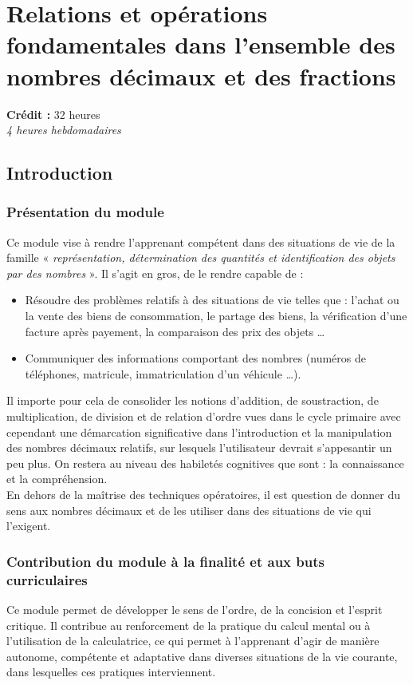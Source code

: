 \chapter{Relations et opérations fondamentales dans l'ensemble des nombres décimaux et des fractions}
 
{\AlegreyaSansLight \large
\begin{center}
\textbf{Crédit :} 32 heures\\
\textit{4 heures hebdomadaires}
\end{center}
}

\minitoc

\section{Introduction}
\subsection{Présentation du module}
Ce module vise à rendre l'apprenant compétent dans des situations de vie de la famille « \textit{représentation, détermination des quantités et identification des objets
par des nombres} ». Il s'agit en gros, de le rendre capable de :
\begin{itemize}
\item Résoudre des problèmes relatifs à des situations de vie telles que : l'achat ou la vente des biens de consommation, le partage des biens, la vérification
d'une facture après payement, la comparaison des prix des objets …
\item Communiquer des informations comportant des nombres (numéros de téléphones, matricule, immatriculation d'un véhicule …).
\end{itemize}
Il importe pour cela de consolider les notions d'addition, de soustraction, de multiplication, de division et de relation d'ordre vues dans le cycle primaire avec
cependant une démarcation significative dans l'introduction et la manipulation des nombres décimaux relatifs, sur lesquels l'utilisateur devrait s'appesantir un peu plus.
On restera au niveau des habiletés cognitives que sont : la connaissance et la compréhension.\\
En dehors de la maîtrise des techniques opératoires, il est question de donner du sens aux nombres décimaux et de les utiliser dans des situations de vie qui l'exigent.

\subsection{Contribution du module à la finalité et aux buts curriculaires}
Ce module permet de développer le sens de l'ordre, de la concision et l'esprit critique. Il contribue au renforcement de la pratique du calcul mental ou à l'utilisation de la calculatrice, ce qui permet à l'apprenant d'agir de manière autonome, compétente et adaptative dans diverses situations de la vie courante, dans lesquelles ces pratiques interviennent.


